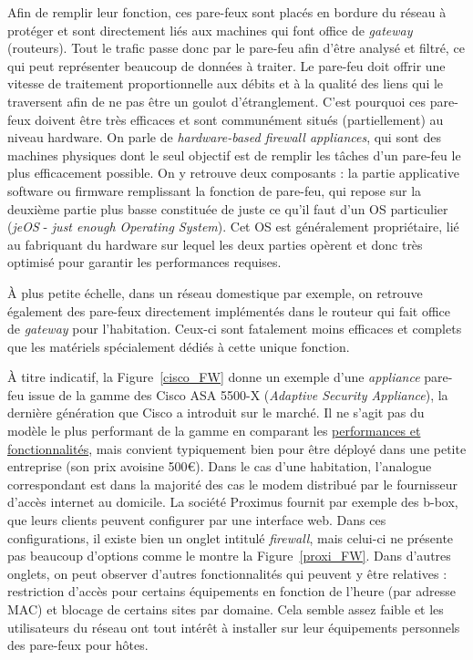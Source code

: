 \documentclass[]{article}
\begin{document}
\par Afin de remplir leur fonction, ces pare-feux sont placés en bordure du réseau à protéger et sont  directement liés aux machines qui font office de \textit{gateway} (routeurs). Tout le trafic passe donc par le pare-feu afin d'être analysé et filtré, ce qui peut représenter beaucoup de données à traiter. Le pare-feu doit offrir une vitesse de traitement proportionnelle aux débits et à la qualité des liens qui le traversent afin de ne pas être un goulot d'étranglement. C'est pourquoi 
ces pare-feux doivent être très efficaces et sont communément situés (partiellement) au niveau hardware. On parle de \textit{hardware-based firewall appliances}, qui sont des machines physiques dont le seul objectif est de remplir les tâches d'un pare-feu le plus efficacement possible. On y retrouve deux composants : la partie applicative software ou firmware remplissant la fonction de pare-feu, qui repose sur la deuxième partie plus basse constituée de juste ce qu'il faut d'un OS particulier (\textit{jeOS} - \textit{just enough Operating System}). Cet OS est généralement propriétaire, lié au fabriquant du hardware sur lequel les deux parties opèrent et donc très optimisé pour garantir les performances requises.\\

\par À plus petite échelle, dans un réseau domestique par exemple, on retrouve également des pare-feux directement implémentés dans le routeur qui fait office de \textit{gateway} pour l'habitation. Ceux-ci sont fatalement moins efficaces et complets que les matériels spécialement dédiés à cette unique fonction.\\

\par À titre indicatif, la Figure~\ref{cisco_FW} donne un exemple d'une \textit{appliance} pare-feu issue de la gamme des Cisco ASA 5500-X (\textit{Adaptive Security Appliance}), la dernière génération que Cisco a introduit sur le marché. Il ne s'agit pas du modèle le plus performant de la gamme en comparant les \href{https://www.cisco.com/c/en/us/products/collateral/security/asa-5500-series-next-generation-firewalls/datasheet-c78-733916.html}{performances et fonctionnalités}, mais convient typiquement bien pour être déployé dans une petite entreprise (son prix avoisine 500\euro). Dans le cas d'une habitation, l'analogue correspondant est dans la majorité des cas le modem distribué par le fournisseur d'accès internet au domicile. La société Proximus fournit par exemple des b-box, que leurs clients peuvent configurer par une interface web. Dans ces configurations, il existe bien un onglet intitulé \textit{firewall}, mais celui-ci ne présente pas beaucoup d'options comme le montre la Figure~\ref{proxi_FW}. Dans d'autres onglets, on peut observer d'autres fonctionnalités qui peuvent y être relatives : restriction d'accès pour certains équipements en fonction de l'heure (par adresse MAC) et blocage de certains sites par domaine. Cela semble assez faible et les utilisateurs du réseau ont tout intérêt à installer sur leur équipements personnels des pare-feux pour hôtes.
\end{document}
